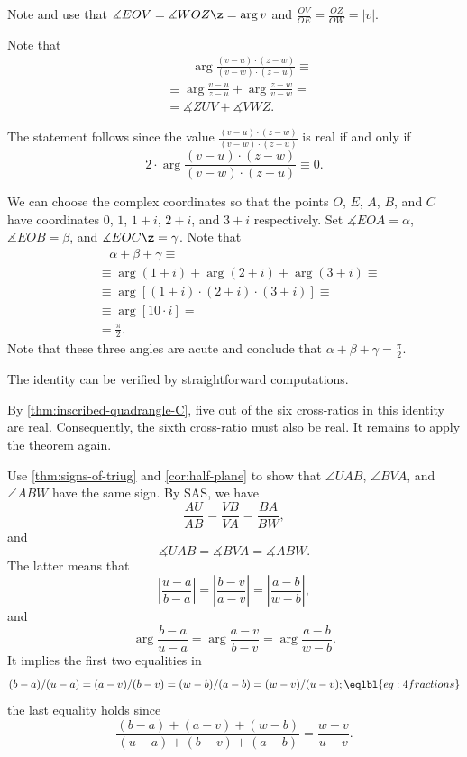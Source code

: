 Note and use that 
$
\measuredangle EOV=\measuredangle WOZ\z=\arg v$
and
$\frac{OV}{OE}=\frac{OZ}{OW}=|v|$.


Note that 
\begin{align*}
&\qquad\arg\frac{(v-u)\cdot(z-w)}{(v-w)\cdot(z-u)}\equiv
\\
&\equiv
\arg\frac{v-u}{z-u}
+
\arg\frac{z-w}{v-w}=
\\
&= \measuredangle ZUV+\measuredangle VWZ.
\end{align*}

The statement follows since the value $\tfrac{(v-u)\cdot(z-w)}{(v-w)\cdot(z-u)}$ is real if and only if 
\[2\cdot\arg\frac{(v-u)\cdot(z-w)}{(v-w)\cdot(z-u)}\equiv0.\]

We can choose the complex coordinates so that the points $O$, $E$, $A$, $B$, and $C$ have coordinates
$0$, $1$, $1+i$, $2+i$, and $3+i$ respectively.
Set $\measuredangle EOA=\alpha$, $\measuredangle EOB=\beta$, and $\measuredangle EOC\z=\gamma$.
Note that
\begin{align*}
&\ \ \ \ \alpha+\beta+\gamma\equiv
\\
&\equiv\arg(1+i)+\arg(2+i)+\arg(3+i)\equiv
\\
&\equiv\arg[(1+i)\cdot(2+i)\cdot(3+i)]\equiv
\\
&\equiv\arg [10\cdot i]=
\\
&=\tfrac\pi2.
\end{align*}
Note that these three angles are acute and conclude that $\alpha+\beta+\gamma=\tfrac\pi2$.

The identity can be verified by straightforward computations.

By \ref{thm:inscribed-quadrangle-C}, five out of the six cross-ratios in this identity are real.
Consequently, the sixth cross-ratio must also be real.
It remains to apply the theorem again.

Use \ref{thm:signs-of-triug} and \ref{cor:half-plane} to show that $\angle UAB$, $\angle BVA$, and $\angle ABW$ have the same sign.
By SAS, we have
\[\frac{AU}{AB}=\frac{VB}{VA}=\frac{BA}{BW},\]
and
\[\measuredangle UAB=\measuredangle BVA=\measuredangle ABW.\]
The latter means that 
\[|\frac{u-a}{b-a}|=|\frac{b-v}{a-v}|=|\frac{a-b}{w-b}|,\]
and
\[\arg\frac{b-a}{u-a}=\arg\frac{a-v}{b-v}=\arg\frac{a-b}{w-b}.\]
It implies the first two equalities in 
\[\frac{b-a}{u-a}=\frac{a-v}{b-v}=\frac{w-b}{a-b}=\frac{w-v}{u-v};\eqlbl{eq:4fractions}\]
the last equality holds since 
\[\frac{(b-a)+(a-v)+(w-b)}{(u-a)+(b-v)+(a-b)}=\frac{w-v}{u-v}.\]

